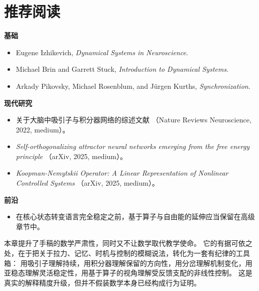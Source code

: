 \section{推荐阅读}

\begin{readingbox}
\textbf{基础}
\begin{itemize}[nosep]
  \item Eugene Izhikevich, \emph{Dynamical Systems in Neuroscience}.
  \item Michael Brin and Garrett Stuck, \emph{Introduction to Dynamical
        Systems}.
  \item Arkady Pikovsky, Michael Rosenblum, and J\"urgen Kurths,
        \emph{Synchronization}.
\end{itemize}
\textbf{现代研究}
\begin{itemize}[nosep]
  \item 关于大脑中吸引子与积分器网络的综述文献
        （Nature Reviews Neuroscience, 2022, medium）。
  \item \emph{Self-orthogonalizing attractor neural networks emerging from the
        free energy principle} （arXiv, 2025, medium）。
  \item \emph{Koopman-Nemytskii Operator: A Linear Representation of Nonlinear
        Controlled Systems} （arXiv, 2025, medium）。
\end{itemize}
\textbf{前沿}
\begin{itemize}[nosep]
  \item 在核心状态转变语言完全稳定之前，基于算子与自由能的延伸应当保留在高级章节中。
\end{itemize}
\end{readingbox}

\begin{summarybox}
本章提升了手稿的数学严肃性，同时又不让数学取代教学使命。
它的有据可依之处，在于把关于拉力、记忆、时机与控制的模糊说法，转化为一套有纪律的工具箱：
用吸引子理解持续，用积分器理解保留的方向性，用分岔理解机制变化，用亚稳态理解灵活稳定性，用基于算子的视角理解受反馈支配的非线性控制。
这是真实的解释精度升级，但并不假装数学本身已经构成行为证明。
\end{summarybox}